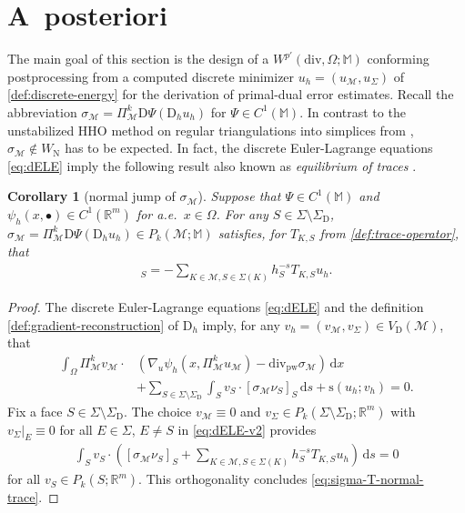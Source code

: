 \documentclass[a4paper]{amsart}
\numberwithin{equation}{section}
\newcommand{\R}{\mathbb{R}}
\renewcommand{\d}[1]{\,\mathrm{d}#1}
\renewcommand{\div}{\mathrm{div}}
\newcommand{\Mcal}{\mathcal{M}}
\newcommand{\pw}{\mathrm{pw}}
\newcommand{\D}{\mathrm{D}}
\newcommand{\s}{\mathrm{s}}
\newcommand{\M}{\mathbb{M}}
\newtheorem{corollary}[theorem]{Corollary}
\theoremstyle{remark}
\begin{document}
\section{A~posteriori}\label{sec:a-posteriori}
The main goal of this section is the design of a $W^{p'}(\div,\Omega;\M)$ conforming postprocessing from a computed discrete minimizer $u_h = (u_\Mcal, u_\Sigma)$ of \eqref{def:discrete-energy} for the derivation of primal-dual error estimates.
Recall the abbreviation $\sigma_\Mcal = \Pi_\Mcal^k \D \Psi(\D_h u_h)$ for $\Psi \in C^1(\M)$.
In contrast to the unstabilized HHO method on regular triangulations into simplices from \cite{CarstensenTran2021}, $\sigma_\Mcal \notin W_\mathrm{N}$ has to be expected.
In fact, the discrete Euler-Lagrange equations \eqref{eq:dELE} imply the following result also known as \emph{equilibrium of traces}  \cite{BottiDiPietroSochala2017,AbbasErnPignet2018}.
\begin{corollary}[normal jump of $\sigma_\Mcal$]\label{cor:normal-jump}
	Suppose that $\Psi \in C^1(\M)$ and $\psi_h(x,\bullet) \in C^1(\R^m)$ for a.e.~$x \in \Omega$.
	For any $S \in \Sigma\setminus\Sigma_\mathrm{D}$, $\sigma_\Mcal = \Pi_\Mcal^k \D \Psi(\D_h u_h) \in P_k(\Mcal;\M)$ satisfies, for $T_{K,S}$ from \eqref{def:trace-operator}, that
	\begin{align}
		[\sigma_\Mcal \nu_S]_S = - \sum_{K \in \Mcal, S \in \Sigma(K)} h_S^{-s} T_{K,S} u_h.
		\label{eq:sigma-T-normal-trace}
	\end{align}
\end{corollary}
\begin{proof}
	The discrete Euler-Lagrange equations \eqref{eq:dELE} and the definition \eqref{def:gradient-reconstruction} of $\D_h$ imply, for any $v_h = (v_\Mcal, v_\Sigma) \in V_\mathrm{D}(\Mcal)$, that
	\begin{align}\label{eq:dELE-v2}
		\int_\Omega \Pi_\Mcal^k v_\Mcal \cdot &(\nabla_u \psi_h(x, \Pi_\Mcal^k u_\Mcal) - \div_\pw \sigma_\Mcal) \d{x}\nonumber\\
		& + \sum_{S \in \Sigma\setminus\Sigma_\mathrm{D}} \int_S v_S \cdot [\sigma_\Mcal \nu_S]_S \d{s} + \s(u_h;v_h) = 0.
	\end{align}
	Fix a face $S \in \Sigma\setminus\Sigma_\mathrm{D}$. The choice $v_\Mcal \equiv 0$ and $v_\Sigma \in P_k(\Sigma\setminus\Sigma_\mathrm{D};\mathbb{R}^m)$ with $v_\Sigma|_E \equiv 0$ for all $E \in \Sigma$, $E \neq S$ in \eqref{eq:dELE-v2} provides
	\begin{align*}
		\int_S v_S\cdot([\sigma_\Mcal\nu_S]_S + \sum_{K \in \Mcal, S \in \Sigma(K)} h_S^{-s} T_{K,S} u_h) \d{s} = 0
	\end{align*}
	for all $v_S \in P_k(S;\R^m)$.
	This orthogonality concludes \eqref{eq:sigma-T-normal-trace}.
\end{proof}
\end{document}
